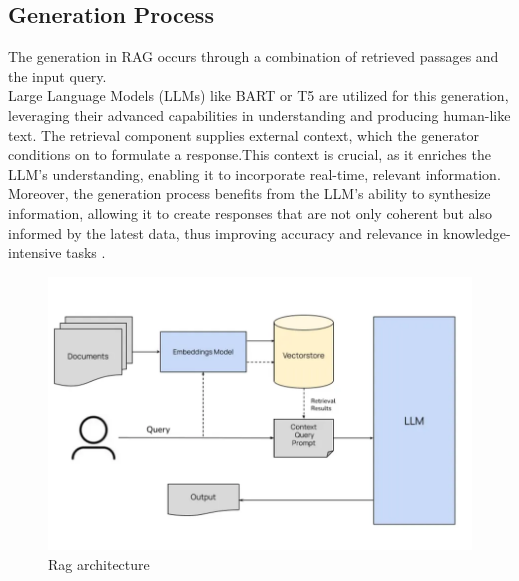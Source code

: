 \subsection{Generation Process}
The generation in RAG occurs through a combination of retrieved passages and the input query.\\
Large Language Models (LLMs) like BART or T5 are utilized for this generation, leveraging their advanced capabilities in understanding and producing human-like text. The retrieval component supplies external context, which the generator conditions on to formulate a response.This context is crucial, as it enriches the LLM's understanding, enabling it to incorporate real-time, relevant information. Moreover, the generation process benefits from the LLM's ability to synthesize information, allowing it to create responses that are not only coherent but also informed by the latest data, thus improving accuracy and relevance in knowledge-intensive tasks \cite{lewis2020retrieval}. \\
\begin{figure}[h]
	\centering
	\includegraphics[width=0.9\linewidth]{Figures/rag_architectur.png}
	\caption{Rag architecture}
	\label{rag_architectur.png}
\end{figure}

